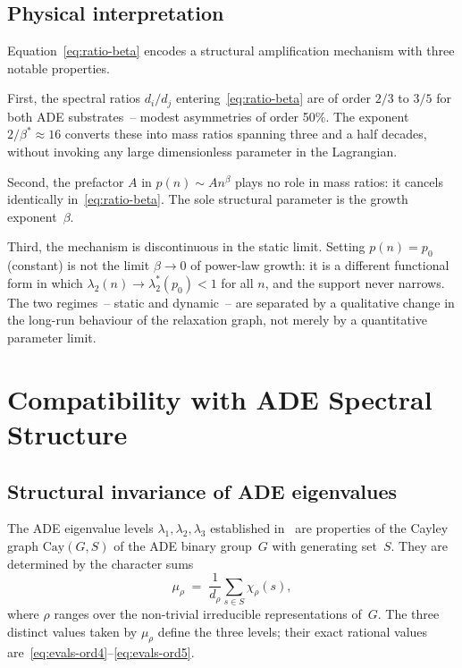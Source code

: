 \documentclass[11pt,a4paper]{article}
\begin{document}
    \subsection{Physical interpretation}
      \label{subsec:interpretation}

      Equation~\eqref{eq:ratio-beta} encodes a structural amplification mechanism
      with three notable properties.

      First, the spectral ratios $d_i/d_j$ entering~\eqref{eq:ratio-beta}
      are of order $2/3$ to $3/5$ for both ADE substrates~-- modest asymmetries
      of order 50\%.
      The exponent $2/\beta^{*} \approx 16$ converts these into mass ratios spanning
      three and a half decades, without invoking any large dimensionless
      parameter in the Lagrangian.

      Second, the prefactor $A$ in $p(n) \sim A n^{\beta}$ plays no role in
      mass ratios: it cancels identically in~\eqref{eq:ratio-beta}.
      The sole structural parameter is the growth exponent~$\beta$.

      Third, the mechanism is discontinuous in the static limit.
      Setting $p(n) = p_0$ (constant) is not the limit $\beta \to 0$
      of power-law growth: it is a different functional form in which
      $\lambda_2(n)\to\lambda_2^*(p_0) < 1$ for all $n$,
      and the support never narrows.
      The two regimes~-- static and dynamic~-- are separated by a qualitative
      change in the long-run behaviour of the relaxation graph,
      not merely by a quantitative parameter limit.

  \section{Compatibility with ADE Spectral Structure}
    \label{sec:ADE}

    \subsection{Structural invariance of ADE eigenvalues}
      \label{subsec:ADE-invariance}

      The ADE eigenvalue levels $\lambda_1, \lambda_2, \lambda_3$ established
      in~\cite{Beau2026a4} are properties of the Cayley graph
      $\mathrm{Cay}(G, S)$ of the ADE binary group~$G$ with generating set~$S$.
      They are determined by the character sums
      \begin{equation}
        \label{eq:char-sum}
        \mu_{\rho}
        \;=\; \frac{1}{d_{\rho}} \sum_{s \in S} \chi_{\rho}(s),
      \end{equation}
      where $\rho$ ranges over the non-trivial irreducible representations of~$G$.
      The three distinct values taken by $\mu_\rho$ define the three levels;
      their exact rational values are~\eqref{eq:evals-ord4}--\eqref{eq:evals-ord5}.
\end{document}
